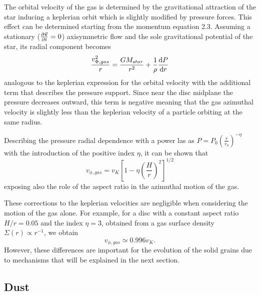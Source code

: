 \documentclass[a4paper,10pt]{report}
\begin{document}
The orbital velocity of the gas is determined by the gravitational attraction of the 
star inducing a keplerian orbit which is slightly modified by pressure forces.
This effect can be determined starting from the momentum equation 2.3.
Assuming a stationary ($\pdv{\va v}{t}= 0$) axisymmetric flow and the sole gravitational potential of the star,
its radial component becomes
\begin{equation}
    \frac{v_{\Phi, gas}^2}{r} = \frac{GM_{star}}{r^2} + \frac 1 \rho \dv{P}{r}
\end{equation}
analogous to the keplerian expression for the orbital velocity with the additional
term that describes the pressure support.
Since near the disc midplane the pressure decreases outward, this term 
is negative meaning that the gas azimuthal velocity is slightly less than the keplerian velocity 
of a particle orbiting at the same radius.

Describing the pressure radial dependence with a power las as 
$P = P_0 \left(\frac{r}{r_0}\right)^{-\eta}$ with the introduction of 
the positive index $\eta$, it can be shown that 
\begin{equation}
    v_{\phi, gas} = v_K \left[ 1 - \eta \left(\frac{H}{r} \right)^2 \right] ^{1/2}
\end{equation}
exposing also the role of the aspect ratio
in the azimuthal motion of the gas.

These corrections to the keplerian velocities are negligible when considering the motion of the gas alone.
For example, for a disc with a constant aspect ratio $H/r = 0.05$ and the index $\eta = 3$, obtained from 
a gas surface density $\Sigma(r) \propto r^{-1}$, we obtain
\begin{equation}
    v_{\phi,gas} \simeq 0.996v_K.
\end{equation}
However, these differences are important for the evolution
of the solid grains due to mechanisms that will be explained in the next section.
\subsection{Dust}
\end{document}
